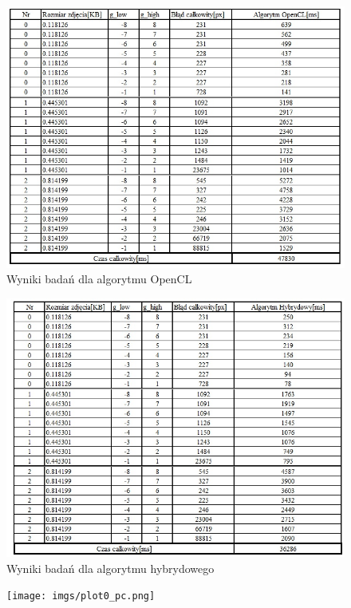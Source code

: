 \documentclass[document.tex]{subfiles}
\begin{document}
\begin{figure}[h]
\includegraphics[scale=0.75]{imgs/results_pc_gpu.jpg}
\caption{Wyniki badań dla algorytmu OpenCL}
\label{fig:results_pc_gpu}
\end{figure}

\begin{figure}[h]
\includegraphics[scale=0.75]{imgs/results_pc_hybrid.jpg}
\caption{Wyniki badań dla algorytmu hybrydowego}
\label{fig:results_pc_hybrid}
\end{figure}


\begin{figure}[h]
\texttt{[image: imgs/plot0\_pc.png]}
\caption*{}
\label{fig:results_pc_hybrid}
\end{figure}
\end{document}
